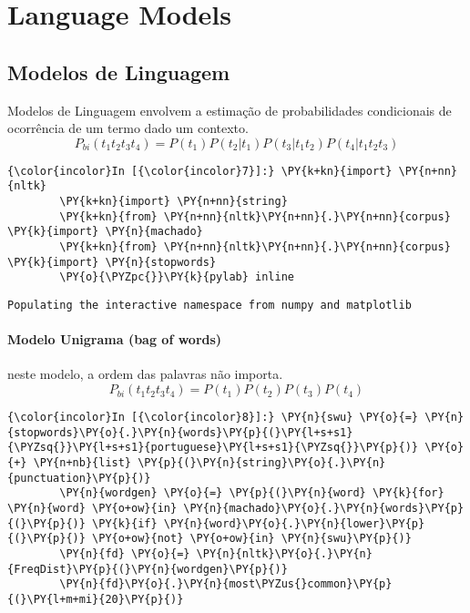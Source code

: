 \chapter{Language Models}

    
    

    
    \section{Modelos de Linguagem}\label{modelos-de-linguagem}

Modelos de Linguagem envolvem a estimação de probabilidades condicionais
de ocorrência de um termo dado um contexto.
\[P_{bi}(t_1t_2t_3t_4) = P(t_1)P(t_2|t_1)P(t_3|t_1t_2)P(t_4|t_1t_2t_3)\]

    \begin{Verbatim}[commandchars=\\\{\}]
{\color{incolor}In [{\color{incolor}7}]:} \PY{k+kn}{import} \PY{n+nn}{nltk}
        \PY{k+kn}{import} \PY{n+nn}{string}
        \PY{k+kn}{from} \PY{n+nn}{nltk}\PY{n+nn}{.}\PY{n+nn}{corpus} \PY{k}{import} \PY{n}{machado}
        \PY{k+kn}{from} \PY{n+nn}{nltk}\PY{n+nn}{.}\PY{n+nn}{corpus} \PY{k}{import} \PY{n}{stopwords}
        \PY{o}{\PYZpc{}}\PY{k}{pylab} inline
\end{Verbatim}

    \begin{Verbatim}[commandchars=\\\{\}]
Populating the interactive namespace from numpy and matplotlib

    \end{Verbatim}

    \subsubsection{Modelo Unigrama (bag of
words)}\label{modelo-unigrama-bag-of-words}

neste modelo, a ordem das palavras não importa.
\[P_{bi}(t_1t_2t_3t_4) = P(t_1)P(t_2)P(t_3)P(t_4)\]

    \begin{Verbatim}[commandchars=\\\{\}]
{\color{incolor}In [{\color{incolor}8}]:} \PY{n}{swu} \PY{o}{=} \PY{n}{stopwords}\PY{o}{.}\PY{n}{words}\PY{p}{(}\PY{l+s+s1}{\PYZsq{}}\PY{l+s+s1}{portuguese}\PY{l+s+s1}{\PYZsq{}}\PY{p}{)} \PY{o}{+} \PY{n+nb}{list} \PY{p}{(}\PY{n}{string}\PY{o}{.}\PY{n}{punctuation}\PY{p}{)}
        \PY{n}{wordgen} \PY{o}{=} \PY{p}{(}\PY{n}{word} \PY{k}{for} \PY{n}{word} \PY{o+ow}{in} \PY{n}{machado}\PY{o}{.}\PY{n}{words}\PY{p}{(}\PY{p}{)} \PY{k}{if} \PY{n}{word}\PY{o}{.}\PY{n}{lower}\PY{p}{(}\PY{p}{)} \PY{o+ow}{not} \PY{o+ow}{in} \PY{n}{swu}\PY{p}{)}
        \PY{n}{fd} \PY{o}{=} \PY{n}{nltk}\PY{o}{.}\PY{n}{FreqDist}\PY{p}{(}\PY{n}{wordgen}\PY{p}{)}
        \PY{n}{fd}\PY{o}{.}\PY{n}{most\PYZus{}common}\PY{p}{(}\PY{l+m+mi}{20}\PY{p}{)}
\end{Verbatim}

